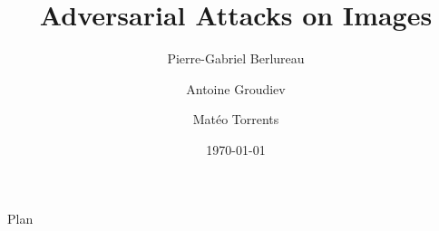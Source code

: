 \documentclass[aspectratio=169]{beamer}
\title{\textbf{Adversarial Attacks on Images}}
\author{Pierre-Gabriel Berlureau\and Antoine Groudiev\and Matéo Torrents}
\date{\today}
\theoremstyle{definition}
\begin{document}
\frame{\titlepage}

\begin{frame}{Plan}
   \tableofcontents
\end{frame}


\begin{frame}[allowframebreaks]
    \nocite{*}
    \printbibliography
\end{frame}
\end{document}

